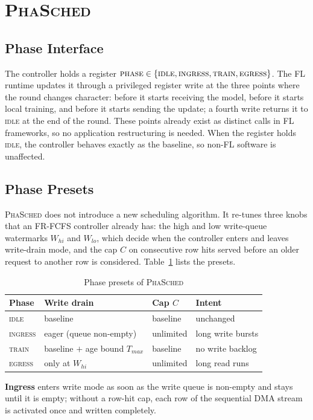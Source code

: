\documentclass[conference]{IEEEtran}
\newcommand{\name}{\textsc{PhaSched}}
\begin{document}
\section{\name{}}
\subsection{Phase Interface}
The controller holds a register $\textsc{phase}\in\{\textsc{idle},\textsc{ingress},\textsc{train},\textsc{egress}\}$. The FL runtime updates it through a privileged register write at the three points where the round changes character: before it starts receiving the model, before it starts local training, and before it starts sending the update; a fourth write returns it to \textsc{idle} at the end of the round.
These points already exist as distinct calls in FL frameworks, so no application restructuring is needed. When the register holds \textsc{idle}, the controller behaves exactly as the baseline, so non-FL software is unaffected.

\subsection{Phase Presets}
\name{} does not introduce a new scheduling algorithm. It re-tunes three knobs that an FR-FCFS controller already has: the high and low write-queue watermarks $W_{hi}$ and $W_{lo}$, which decide when the controller enters and leaves write-drain mode, and the cap $C$ on consecutive row hits served before an older request to another row is considered. Table~\ref{tab:presets} lists the presets.

\begin{table}[t]
\centering
\caption{Phase presets of \name{}}
\label{tab:presets}
\footnotesize
\begin{tabular}{@{}llll@{}}
\toprule
Phase & Write drain & Cap $C$ & Intent \\
\midrule
\textsc{idle} & baseline & baseline & unchanged \\
\textsc{ingress} & eager (queue non-empty) & unlimited & long write bursts \\
\textsc{train} & baseline $+$ age bound $T_{max}$ & baseline & no write backlog \\
\textsc{egress} & only at $W_{hi}$ & unlimited & long read runs \\
\bottomrule
\end{tabular}
\end{table}

\textbf{Ingress} enters write mode as soon as the write queue is non-empty and stays until it is empty; without a row-hit cap, each row of the sequential DMA stream is activated once and written completely.
\end{document}
